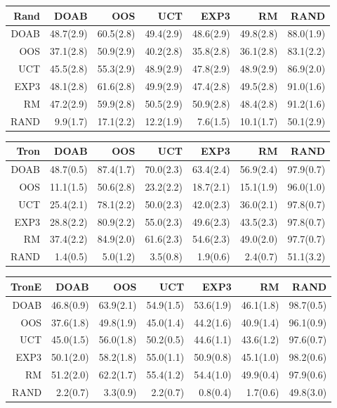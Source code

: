 \begin{figure}
\begin{scriptsize}
\begin{tabular}{|r|rrrrrr|}\hline
Rand&DOAB&OOS&UCT&EXP3&RM&RAND\\\hline
DOAB&48.7(2.9)&60.5(2.8)&49.4(2.9)&48.6(2.9)&49.8(2.8)&88.0(1.9)\\
OOS&37.1(2.8)&50.9(2.9)&40.2(2.8)&35.8(2.8)&36.1(2.8)&83.1(2.2)\\
UCT&45.5(2.8)&55.3(2.9)&48.9(2.9)&47.8(2.9)&48.9(2.9)&86.9(2.0)\\
EXP3&48.1(2.8)&61.6(2.8)&49.9(2.9)&47.4(2.8)&49.5(2.8)&91.0(1.6)\\
RM&47.2(2.9)&59.9(2.8)&50.5(2.9)&50.9(2.8)&48.4(2.8)&91.2(1.6)\\
RAND&9.9(1.7)&17.1(2.2)&12.2(1.9)&7.6(1.5)&10.1(1.7)&50.1(2.9)\\
\hline
\end{tabular}

\begin{tabular}{|r|rrrrrr|}\hline
Tron&DOAB&OOS&UCT&EXP3&RM&RAND\\\hline
DOAB&48.7(0.5)&87.4(1.7)&70.0(2.3)&63.4(2.4)&56.9(2.4)&97.9(0.7)\\
OOS&11.1(1.5)&50.6(2.8)&23.2(2.2)&18.7(2.1)&15.1(1.9)&96.0(1.0)\\
UCT&25.4(2.1)&78.1(2.2)&50.0(2.3)&42.0(2.3)&36.0(2.1)&97.8(0.7)\\
EXP3&28.8(2.2)&80.9(2.2)&55.0(2.3)&49.6(2.3)&43.5(2.3)&97.8(0.7)\\
RM&37.4(2.2)&84.9(2.0)&61.6(2.3)&54.6(2.3)&49.0(2.0)&97.7(0.7)\\
RAND&1.4(0.5)&5.0(1.2)&3.5(0.8)&1.9(0.6)&2.4(0.7)&51.1(3.2)\\
\hline
\end{tabular}

\begin{tabular}{|r|rrrrrr|}\hline
TronE&DOAB&OOS&UCT&EXP3&RM&RAND\\\hline
DOAB&46.8(0.9)&63.9(2.1)&54.9(1.5)&53.6(1.9)&46.1(1.8)&98.7(0.5)\\
OOS&37.6(1.8)&49.8(1.9)&45.0(1.4)&44.2(1.6)&40.9(1.4)&96.1(0.9)\\
UCT&45.0(1.5)&56.0(1.8)&50.2(0.5)&44.6(1.1)&43.6(1.2)&97.6(0.7)\\
EXP3&50.1(2.0)&58.2(1.8)&55.0(1.1)&50.9(0.8)&45.1(1.0)&98.2(0.6)\\
RM&51.2(2.0)&62.2(1.7)&55.4(1.2)&54.4(1.0)&49.9(0.4)&97.9(0.6)\\
RAND&2.2(0.7)&3.3(0.9)&2.2(0.7)&0.8(0.4)&1.7(0.6)&49.8(3.0)\\
\hline
\end{tabular}


\end{scriptsize}
\end{figure}
